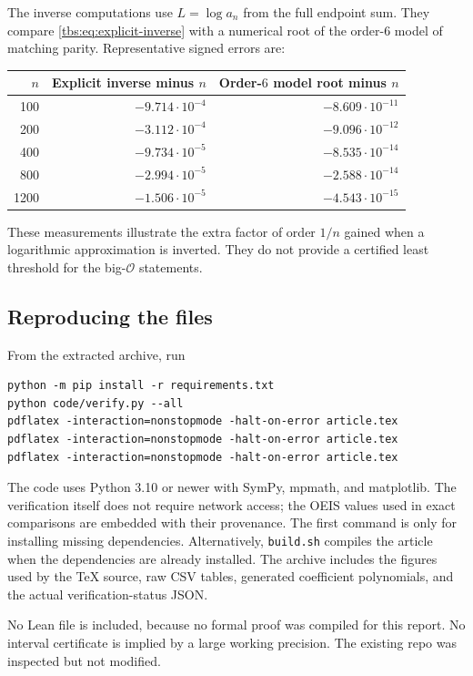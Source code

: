 \documentclass[11pt,a4paper]{article}
\numberwithin{equation}{section}
\theoremstyle{definition}
\newcommand{\OO}{\mathcal O}
\newcommand{\code}[1]{\texttt{#1}}
\begin{document}
The inverse computations use $L=\log a_n$ from the full endpoint sum.
They compare \eqref{tbs:eq:explicit-inverse} with a numerical root of the
order-$6$ model of matching parity. Representative signed errors are:
\begin{center}
\small
\begin{tabular}{@{}r r r@{}}
\toprule
$n$ & Explicit inverse minus $n$ & Order-$6$ model root minus $n$\\
\midrule
100 & $-9.714\cdot10^{-4}$ & $-8.609\cdot10^{-11}$\\
200 & $-3.112\cdot10^{-4}$ & $-9.096\cdot10^{-12}$\\
400 & $-9.734\cdot10^{-5}$ & $-8.535\cdot10^{-14}$\\
800 & $-2.994\cdot10^{-5}$ & $-2.588\cdot10^{-14}$\\
1200 & $-1.506\cdot10^{-5}$ & $-4.543\cdot10^{-15}$\\
\bottomrule
\end{tabular}
\end{center}
These measurements illustrate the extra factor of order $1/n$ gained
when a logarithmic approximation is inverted. They do not provide a
certified least threshold for the big-$\OO$ statements.

\subsection{Reproducing the files}
From the extracted archive, run
\begin{verbatim}
python -m pip install -r requirements.txt
python code/verify.py --all
pdflatex -interaction=nonstopmode -halt-on-error article.tex
pdflatex -interaction=nonstopmode -halt-on-error article.tex
pdflatex -interaction=nonstopmode -halt-on-error article.tex
\end{verbatim}
The code uses Python 3.10 or newer with SymPy, mpmath, and matplotlib.
The verification itself does not require network access; the OEIS values
used in exact comparisons are embedded with their provenance. The first
command is only for installing missing dependencies. Alternatively,
\code{build.sh} compiles the article when the dependencies are already
installed. The archive includes the figures used by the TeX source,
raw CSV tables, generated coefficient polynomials, and the actual
verification-status JSON.

No Lean file is included, because no formal proof was compiled for this
report. No interval certificate is implied by a large working precision.
The existing repo was inspected but not modified.
\end{document}
